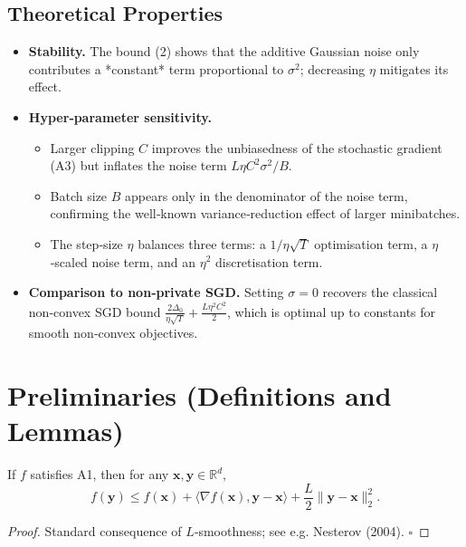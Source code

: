 \documentclass{article}
\begin{document}
\subsection*{Theoretical Properties}
\begin{itemize}[leftmargin=*]
\item \textbf{Stability.} The bound (2) shows that the additive Gaussian noise only contributes a *constant* term proportional to $\sigma^{2}$; decreasing $\eta$ mitigates its effect.
\item \textbf{Hyper‑parameter sensitivity.}
    \begin{itemize}
        \item Larger clipping $C$ improves the unbiasedness of the stochastic gradient (A3) but inflates the noise term $L\eta C^{2}\sigma^{2}/B$.
        \item Batch size $B$ appears only in the denominator of the noise term, confirming the well‑known variance‑reduction effect of larger minibatches.
        \item The step‑size $\eta$ balances three terms: a $1/\eta\sqrt{T}$ optimisation term, a $\eta$‑scaled noise term, and an $\eta^{2}$ discretisation term.
    \end{itemize}
\item \textbf{Comparison to non‑private SGD.}
    Setting $\sigma=0$ recovers the classical non‑convex SGD bound
    $\frac{2\Delta_0}{\eta\sqrt{T}}+\frac{L\eta^{2}C^{2}}{2}$,
    which is optimal up to constants for smooth non‑convex objectives.
\end{itemize}

\section*{Preliminaries (Definitions and Lemmas)}
\begin{lemma}\label{lem:smooth}
If $f$ satisfies A1, then for any $\mathbf{x},\mathbf{y}\in\mathbb{R}^{d}$,
\[
    f(\mathbf{y})\le f(\mathbf{x})+\langle\nabla f(\mathbf{x}),\mathbf{y}-\mathbf{x}\rangle
    +\frac{L}{2}\|\mathbf{y}-\mathbf{x}\|_2^{2}.
\tag{L1}
\]
\end{lemma}
\begin{proof}
Standard consequence of $L$‑smoothness; see e.g. Nesterov (2004). \hfill $\square$
\end{proof}
\end{document}
